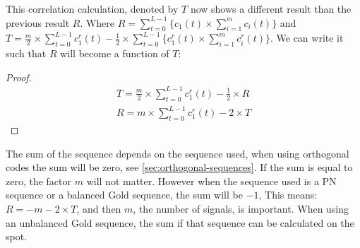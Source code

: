 This correlation calculation, denoted by $T$ now shows a different result than the previous result $R$.
Where $R = \displaystyle\sum_{t = 0} ^ {L - 1}  \Bigg\{  c_1(t)	\times \displaystyle\sum_{i = 1} ^ {m} c_i(t) \Bigg\}$ and $T = \frac{m}{2} \times \displaystyle\sum_{t = 0} ^ {L - 1} c^r_1(t) - \frac{1}{2} \times \displaystyle\sum_{t = 0} ^ {L - 1}  \Bigg\{ c^r_1(t) \times \displaystyle\sum_{i = 1} ^ {m} c^r_i(t) \Bigg\}$.
We can write it such that $R$ will become a function of $T$: 

\begin{proof}

	\begin{align*}
	T = \frac{m}{2} \times \displaystyle\sum_{t = 0} ^ {L - 1} c^r_1(t) - \frac{1}{2} \times R
	\\ R = m \times \displaystyle\sum_{t = 0} ^ {L - 1} c^r_1(t) - 2 \times T
	\end{align*}

\end{proof}

The sum of the sequence depends on the sequence used, when using orthogonal codes the sum will be zero, see \autoref{sec:orthogonal-sequences}.
If the sum is equal to zero, the factor $m$ will not matter.
However when the sequence used is a PN sequence or a balanced Gold sequence, the sum will be $-1$, This means: $R = -m - 2 \times T$, and then $m$, the number of signals, is important.
When using an unbalanced Gold sequence, the sum if that sequence can be calculated on the spot.









